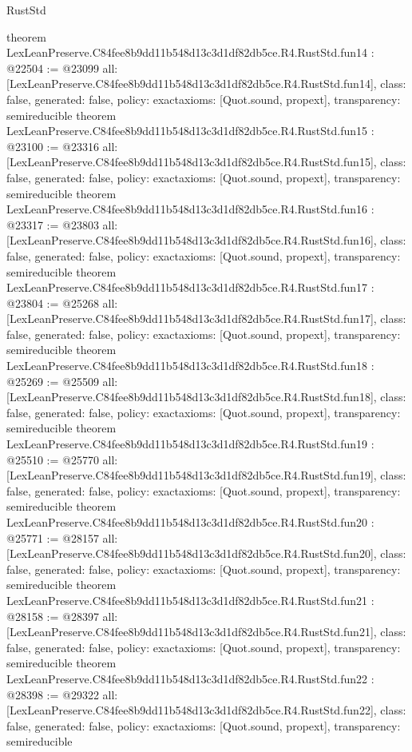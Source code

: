 \begin{lexlean}{RustStd}
\begin{coremodule}
{}
theorem LexLeanPreserve.C84fee8b9dd11b548d13c3d1df82db5ce.R4.RustStd.fun14 : @22504 := @23099 {
  all: [LexLeanPreserve.C84fee8b9dd11b548d13c3d1df82db5ce.R4.RustStd.fun14],
  class: false,
  generated: false,
  policy: exact{axioms: [Quot.sound, propext]},
  transparency: semireducible
}
theorem LexLeanPreserve.C84fee8b9dd11b548d13c3d1df82db5ce.R4.RustStd.fun15 : @23100 := @23316 {
  all: [LexLeanPreserve.C84fee8b9dd11b548d13c3d1df82db5ce.R4.RustStd.fun15],
  class: false,
  generated: false,
  policy: exact{axioms: [Quot.sound, propext]},
  transparency: semireducible
}
theorem LexLeanPreserve.C84fee8b9dd11b548d13c3d1df82db5ce.R4.RustStd.fun16 : @23317 := @23803 {
  all: [LexLeanPreserve.C84fee8b9dd11b548d13c3d1df82db5ce.R4.RustStd.fun16],
  class: false,
  generated: false,
  policy: exact{axioms: [Quot.sound, propext]},
  transparency: semireducible
}
theorem LexLeanPreserve.C84fee8b9dd11b548d13c3d1df82db5ce.R4.RustStd.fun17 : @23804 := @25268 {
  all: [LexLeanPreserve.C84fee8b9dd11b548d13c3d1df82db5ce.R4.RustStd.fun17],
  class: false,
  generated: false,
  policy: exact{axioms: [Quot.sound, propext]},
  transparency: semireducible
}
theorem LexLeanPreserve.C84fee8b9dd11b548d13c3d1df82db5ce.R4.RustStd.fun18 : @25269 := @25509 {
  all: [LexLeanPreserve.C84fee8b9dd11b548d13c3d1df82db5ce.R4.RustStd.fun18],
  class: false,
  generated: false,
  policy: exact{axioms: [Quot.sound, propext]},
  transparency: semireducible
}
theorem LexLeanPreserve.C84fee8b9dd11b548d13c3d1df82db5ce.R4.RustStd.fun19 : @25510 := @25770 {
  all: [LexLeanPreserve.C84fee8b9dd11b548d13c3d1df82db5ce.R4.RustStd.fun19],
  class: false,
  generated: false,
  policy: exact{axioms: [Quot.sound, propext]},
  transparency: semireducible
}
theorem LexLeanPreserve.C84fee8b9dd11b548d13c3d1df82db5ce.R4.RustStd.fun20 : @25771 := @28157 {
  all: [LexLeanPreserve.C84fee8b9dd11b548d13c3d1df82db5ce.R4.RustStd.fun20],
  class: false,
  generated: false,
  policy: exact{axioms: [Quot.sound, propext]},
  transparency: semireducible
}
theorem LexLeanPreserve.C84fee8b9dd11b548d13c3d1df82db5ce.R4.RustStd.fun21 : @28158 := @28397 {
  all: [LexLeanPreserve.C84fee8b9dd11b548d13c3d1df82db5ce.R4.RustStd.fun21],
  class: false,
  generated: false,
  policy: exact{axioms: [Quot.sound, propext]},
  transparency: semireducible
}
theorem LexLeanPreserve.C84fee8b9dd11b548d13c3d1df82db5ce.R4.RustStd.fun22 : @28398 := @29322 {
  all: [LexLeanPreserve.C84fee8b9dd11b548d13c3d1df82db5ce.R4.RustStd.fun22],
  class: false,
  generated: false,
  policy: exact{axioms: [Quot.sound, propext]},
  transparency: semireducible
}
\end{coremodule}
\end{lexlean}
